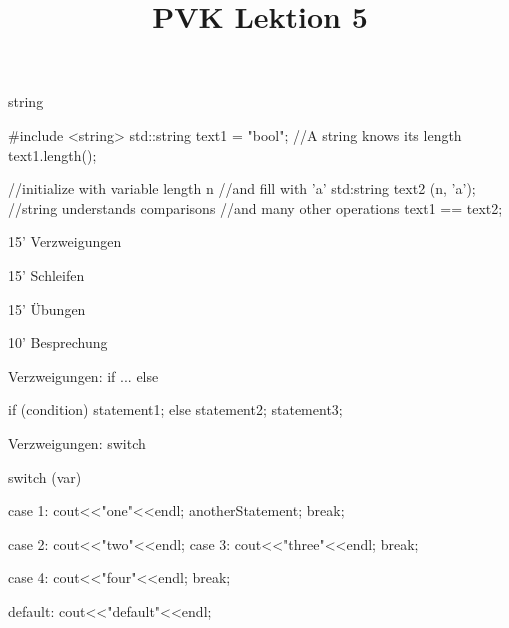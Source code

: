 \ifnum\conditionmacro=1 \documentclass[handout,usenames,dvipsnames]{beamer}\fi
\begin{document}
\begin{frame}[fragile]{string}
\begin{TPCpp}
#include <string>
std::string text1 = "bool";
//A string knows its length
text1.length();

//initialize with variable length n
//and fill with 'a'
std:string text2 (n, 'a');
//string understands comparisons
//and many other operations
text1 == text2; 
\end{TPCpp}

\end{frame}


\title{PVK Lektion 5}

\maketitle

\begin{TFTimeSchedule}
\item 15' Verzweigungen
\item 15' Schleifen
\item 15' Übungen
\item 10' Besprechung
\end{TFTimeSchedule}

\begin{frame}[fragile]{Verzweigungen: if ... else}
\begin{TFCpp}
if (condition)
	statement1;
else{
	statement2;
	statement3;
}
\end{TFCpp}
\end{frame}

\begin{frame}[fragile]{Verzweigungen: switch}
\begin{TPCpp}
switch (var) {
	case 1: cout<<"one"<<endl;
	anotherStatement;
	break;
	
	case 2: cout<<"two"<<endl;
	case 3: cout<<"three"<<endl;
	break;
	
	case 4: cout<<"four"<<endl;
	break;
	
	default: cout<<"default"<<endl;
}
\end{TPCpp}
\end{frame}
\end{document}
